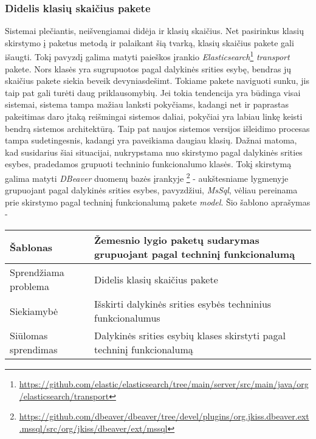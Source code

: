 \subsubsection{Didelis klasių skaičius pakete}
Sistemai plečiantis, neišvengiamai didėja ir klasių skaičius. Net pasirinkus klasių skirstymo į paketus metodą
ir palaikant šią tvarką, klasių skaičius pakete gali išaugti. Tokį pavyzdį galima matyti paieškos įrankio \textit{Elasticsearch}\footnote{\url{https://github.com/elastic/elasticsearch/tree/main/server/src/main/java/org/elasticsearch/transport}}
\textit{transport} pakete. Nors klasės yra sugrupuotos pagal dalykinės srities esybę, bendras jų skaičius pakete siekia beveik devyniasdešimt.
Tokiame pakete naviguoti sunku, jis taip pat gali turėti daug priklausomybių.
Jei tokia tendencija yra būdinga visai sistemai, sistema tampa mažiau lanksti pokyčiams, kadangi net ir paprastas pakeitimas
daro įtaką reišmingai sistemos daliai, pokyčiai yra labiau linkę keisti bendrą sistemos architektūrą.
Taip pat naujos sistemos versijos išleidimo  procesas tampa sudetingesnis, kadangi yra paveikiama daugiau klasių.
Dažnai matoma, kad susidarius šiai situacijai, nukrypstama nuo skirstymo pagal dalykinės srities esybes, pradedamos grupuoti
techninio funkcionalumo klasės. Tokį skirstymą galima matyti \textit{DBeaver} duomenų bazės įrankyje \footnote{\url{https://github.com/dbeaver/dbeaver/tree/devel/plugins/org.jkiss.dbeaver.ext.mssql/src/org/jkiss/dbeaver/ext/mssql}} -
aukštesniame lygmenyje grupuojant pagal dalykinės srities esybes, pavyzdžiui, \textit{MsSql}, vėliau pereinama prie skirstymo
pagal techninį funkcionalumą pakete \textit{model}.
Šio šablono aprašymas -
\begin{center}
    \begin{tabular}{|p{5cm}|p{10cm}|}
        \hline
        Šablonas &  Žemesnio lygio paketų sudarymas grupuojant pagal techninį funkcionalumą \\ [0.5ex]
        \hline\hline
        Sprendžiama problema & Didelis klasių skaičius pakete\\
        \hline
        Siekiamybė &  Išskirti dalykinės srities esybės techninius funkcionalumus \\
        \hline
        Siūlomas sprendimas & Dalykinės srities esybių klases skirstyti pagal techninį funkcionalumą \\
        \hline
    \end{tabular}
\end{center}

